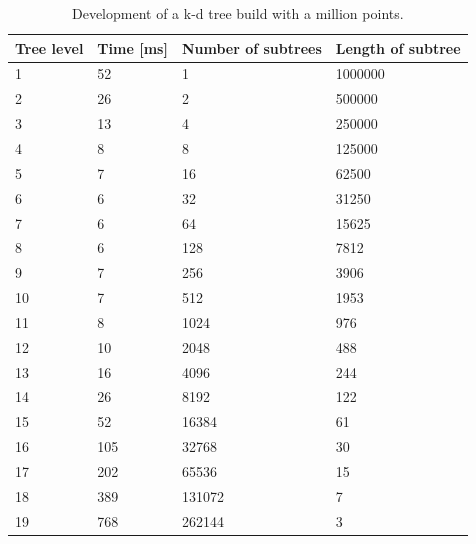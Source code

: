 \begin{table}[c]
\centering
    \begin{tabular}{|l|l|l|l|}
        \hline
        \textbf{Tree level} & \textbf{Time [ms]} & \textbf{Number of subtrees} & \textbf{Length of subtree}\\ \hline
        1          & 52       & 1                  & 1000000      \\ \hline
        2          & 26       & 2                  & 500000       \\ \hline
        3          & 13       & 4                  & 250000       \\ \hline
        4          & 8        & 8                  & 125000       \\ \hline
        5          & 7        & 16                 & 62500        \\ \hline
        6          & 6        & 32                 & 31250        \\ \hline
        7          & 6        & 64                 & 15625        \\ \hline
        8          & 6        & 128                & 7812         \\ \hline
        9          & 7        & 256                & 3906         \\ \hline
        10         & 7        & 512                & 1953         \\ \hline
        11         & 8        & 1024               & 976          \\ \hline
        12         & 10       & 2048               & 488          \\ \hline
        13         & 16       & 4096               & 244          \\ \hline
        14         & 26       & 8192               & 122          \\ \hline
        15         & 52       & 16384              & 61           \\ \hline
        16         & 105      & 32768              & 30           \\ \hline
        17         & 202      & 65536              & 15           \\ \hline
        18         & 389      & 131072             & 7            \\ \hline
        19         & 768      & 262144             & 3            \\ \hline
    \end{tabular}
    \caption{Development of a k-d tree build with a million points.}
    \label{tbl:nvprc_balance_branch}
\end{table}

